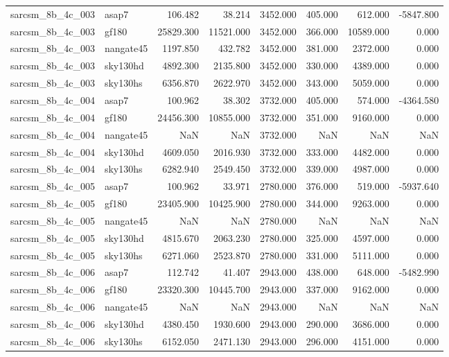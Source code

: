 \begin{tabular}{llrrrrrr}
sarcsm\_8b\_4c\_003 & asap7 & 106.482 & 38.214 & 3452.000 & 405.000 & 612.000 & -5847.800 \\
sarcsm\_8b\_4c\_003 & gf180 & 25829.300 & 11521.000 & 3452.000 & 366.000 & 10589.000 & 0.000 \\
sarcsm\_8b\_4c\_003 & nangate45 & 1197.850 & 432.782 & 3452.000 & 381.000 & 2372.000 & 0.000 \\
sarcsm\_8b\_4c\_003 & sky130hd & 4892.300 & 2135.800 & 3452.000 & 330.000 & 4389.000 & 0.000 \\
sarcsm\_8b\_4c\_003 & sky130hs & 6356.870 & 2622.970 & 3452.000 & 343.000 & 5059.000 & 0.000 \\
sarcsm\_8b\_4c\_004 & asap7 & 100.962 & 38.302 & 3732.000 & 405.000 & 574.000 & -4364.580 \\
sarcsm\_8b\_4c\_004 & gf180 & 24456.300 & 10855.000 & 3732.000 & 351.000 & 9160.000 & 0.000 \\
sarcsm\_8b\_4c\_004 & nangate45 & NaN & NaN & 3732.000 & NaN & NaN & NaN \\
sarcsm\_8b\_4c\_004 & sky130hd & 4609.050 & 2016.930 & 3732.000 & 333.000 & 4482.000 & 0.000 \\
sarcsm\_8b\_4c\_004 & sky130hs & 6282.940 & 2549.450 & 3732.000 & 339.000 & 4987.000 & 0.000 \\
sarcsm\_8b\_4c\_005 & asap7 & 100.962 & 33.971 & 2780.000 & 376.000 & 519.000 & -5937.640 \\
sarcsm\_8b\_4c\_005 & gf180 & 23405.900 & 10425.900 & 2780.000 & 344.000 & 9263.000 & 0.000 \\
sarcsm\_8b\_4c\_005 & nangate45 & NaN & NaN & 2780.000 & NaN & NaN & NaN \\
sarcsm\_8b\_4c\_005 & sky130hd & 4815.670 & 2063.230 & 2780.000 & 325.000 & 4597.000 & 0.000 \\
sarcsm\_8b\_4c\_005 & sky130hs & 6271.060 & 2523.870 & 2780.000 & 331.000 & 5111.000 & 0.000 \\
sarcsm\_8b\_4c\_006 & asap7 & 112.742 & 41.407 & 2943.000 & 438.000 & 648.000 & -5482.990 \\
sarcsm\_8b\_4c\_006 & gf180 & 23320.300 & 10445.700 & 2943.000 & 337.000 & 9162.000 & 0.000 \\
sarcsm\_8b\_4c\_006 & nangate45 & NaN & NaN & 2943.000 & NaN & NaN & NaN \\
sarcsm\_8b\_4c\_006 & sky130hd & 4380.450 & 1930.600 & 2943.000 & 290.000 & 3686.000 & 0.000 \\
sarcsm\_8b\_4c\_006 & sky130hs & 6152.050 & 2471.130 & 2943.000 & 296.000 & 4151.000 & 0.000 \\

\end{tabular}

